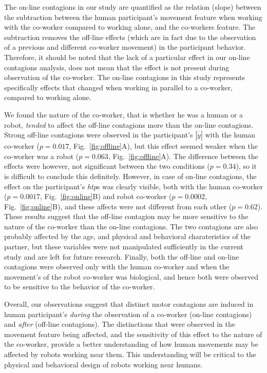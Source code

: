 The on-line contagions in our study are quantified as the relation (slope) between the subtraction between the human participant's movement feature when working with the co-worker compared to working alone, and the co-workers feature. The subtraction removes the off-line effects (which are in fact due to the observation of a previous and different co-worker movement) in the participant behavior. Therefore, it should be noted that the lack of a particular effect in our on-line contagions analysis, does not mean that the effect is not present during observation of the co-worker. The on-line contagions in this study represents specifically effects that changed when working in parallel to a co-worker, compared to working alone.

We found the nature of the co-worker, that is whether he was a human or a robot, \textit{tended} to affect the off-line contagions more than the on-line contagions. Strong off-line contagions were observed in the participant's $|\overline{\dot{y}}|$ with the human co-worker ($p = 0.017$, Fig.~\ref{fig:offline}A), but this effect seemed weaker when the co-worker was a robot ($p = 0.063$, Fig.~\ref{fig:offline}A). The difference between the effects were however, not significant between the two conditions ($p = 0.34$), so it is difficult to conclude this definitely. However, in case of on-line contagions, the effect on the participant's {\it htp}s was clearly visible, both with the human co-worker ($p = 0.0017$, Fig.~\ref{fig:online}B) and robot co-worker ($p = 0.0002$, Fig.~\ref{fig:online}B), and these affects were not different from each other ($p = 0.62$). These results suggest that the off-line contagion may be more sensitive to the nature of the co-worker than the on-line contagions. The two contagions are also probably affected by the age, and physical and behavioral charateristics of the partner, but these variables were not manipulated sufficiently in the current study and are left for future research. Finally, both the off-line and on-line contagions were observed only with the human co-worker and when the movement's of the robot co-worker was biological, and hence both were observed to be sensitive to the behavior of the co-worker.

Overall, our observations suggest that distinct motor contagions are induced in human participant's \emph{during} the observation of a co-worker (on-line contagions) and \emph{after} (off-line contagions). The distinctions that were observed in the movement feature being affected, and the sensitivity of this effect to the nature of the co-worker, provide a better understanding of how human movements may be affected by robots working near them. This understanding will be critical to the physical and behavioral design of robots working near humans.


\clearpage